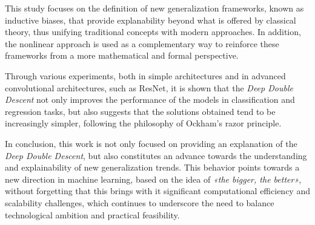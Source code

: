 This study focuses on the definition of new generalization frameworks, known as inductive biases, that provide explanability beyond what is offered by classical theory, thus unifying traditional concepts with modern approaches. In addition, the nonlinear approach is used as a complementary way to reinforce these frameworks from a more mathematical and formal perspective.

Through various experiments, both in simple architectures and in advanced convolutional architectures, such as ResNet, it is shown that the \emph{Deep Double Descent} not only improves the performance of the models in classification and regression tasks, but also suggests that the solutions obtained tend to be increasingly simpler, following the philosophy of Ockham's razor principle.

In conclusion, this work is not only focused on providing an explanation of the \emph{Deep Double Descent}, but also constitutes an advance towards the understanding and explainability of new generalization trends. This behavior points towards a new direction in machine learning, based on the idea of \emph{«the bigger, the better»}, without forgetting that this brings with it significant computational efficiency and scalability challenges, which continues to underscore the need to balance technological ambition and practical feasibility.

\clearpage
\thispagestyle{empty}
\mbox{}
\newpage
\endinput
